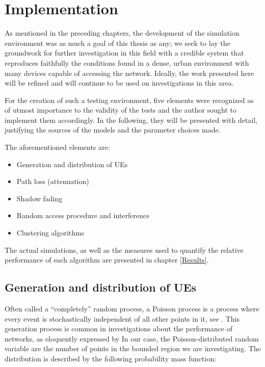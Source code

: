 \chapter{Implementation} \label{Implementation}

As mentioned in the preceding chapters, the development of the simulation environment was as much a goal of this thesis as any; we seek to lay the groundwork for further investigation in this field with a credible system that reproduces faithfully the conditions found in a dense, urban environment with many devices capable of accessing the network. Ideally, the work presented here will be refined and will continue to be used on investigations in this area.

For the creation of such a testing environment, five elements were recognized as of utmost importance to the validity of the tests and the author sought to implement them accordingly. In the following, they will be presented with detail, justifying the sources of the models and the parameter choices made.

The aforementioned elements are:

\begin{itemize}
	\item Generation and distribution of UEs %
	\item Path loss (attenuation) %
	\item Shadow fading %
	\item Random access procedure and interference %
  \item Clustering algorithms
\end{itemize}

The actual simulations, as well as the measures used to quantify the relative performance of each algorithm are presented in chapter \ref{Results}.

\section{Generation and distribution of UEs} \label{PPP}
Often called a ``completely'' random process, a Poisson process is a process where every event is stochastically independent of all other points in it, see \cite{Keeler2016}. This generation process is common in investigations about the performance of networks, as eloquently expressed by \cite{Keeler} In our case, the Poisson-distributed random variable are the number of points in the bounded region we are investigating. The distribution is described by the following probability mass function:

